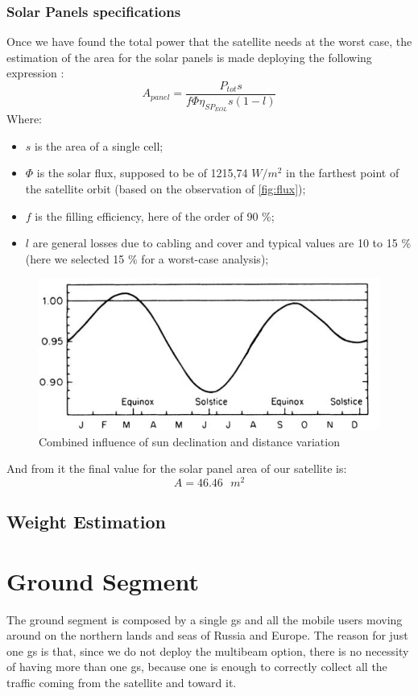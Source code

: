 \documentclass[11pt,a4paper,titlepage]{article}
\begin{document}
		\subsubsection{Solar Panels specifications}
			Once we have found the total power that the satellite needs at the worst case, the estimation of the area for the solar panels is made deploying the following expression \cite{Maral17}:
\begin{equation}
A_{panel} = \frac{P_{tot} s}{f \Phi \eta_{SP_{EOL}} s (1 - l)}
\end{equation}
Where:
\begin{itemize}
\item $s$ is the area of a single cell;
\item $\Phi$ is the solar flux, supposed to be of 1215,74 $W/m^2$ in the farthest point of the satellite orbit (based on the observation of \autoref{fig:flux});
\item $f$ is the filling efficiency, here of the order of 90 \%;
\item $l$ are general losses due to cabling and cover and typical values are 10 to 15 \% (here we selected 15 \% for a worst-case analysis);
\end{itemize}
\begin{figure}[h]
\centering
\includegraphics[width = .7\textwidth]{flux.png}
\caption{Combined influence of sun declination and distance variation}
\label{fig:flux}
\end{figure}
And from it the final value for the solar panel area of our satellite is:
\begin{equation}
A = 46.46 \text{ $m^2$}
\end{equation}
	\subsection{Weight Estimation}
		\lipsum[1]
\section{Ground Segment}
	The ground segment is composed by a single \gls{gs} and all the mobile users moving around on the northern lands and 		seas of Russia and Europe. The reason for just one \gls{gs} is that, since we do not deploy the multibeam option, there is no 		necessity of having more than one \gls{gs}, because one is enough to correctly collect all the traffic coming from the satellite 		and toward it.
\end{document}
